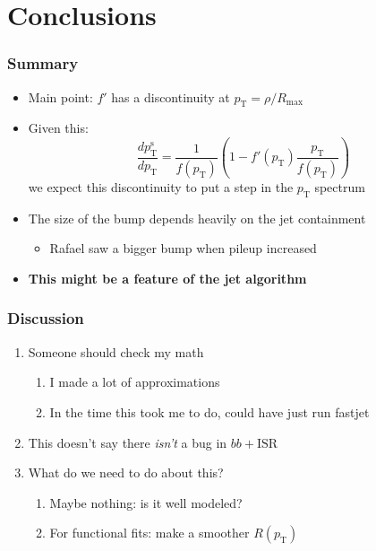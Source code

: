 \documentclass[xcolor={table}]{beamer}
\newcommand{\pt}{p_{\mathrm{T}}}
\newcommand{\ptr}{\pt}
\newcommand{\ptt}{\pt^{\text{s}}}
\begin{document}
\section{Conclusions}

\begin{frame}
  \frametitle{Summary}
  \begin{itemize}
  \item Main point: $f'$ has a discontinuity at $\ptr = \rho / R_{\text{max}}$
  \item Given this:
    \[ \frac{d\ptt}{d\ptr} = \frac{1}{f(\ptr)} \left( 1 - f'(\ptr) \frac{\ptr}{f(\ptr)} \right) \]
    we expect this discontinuity to put a step in the $\ptr$ spectrum
  \item The size of the bump depends heavily on the jet containment
    \begin{itemize}
    \item Rafael saw a bigger bump when pileup increased
    \end{itemize}
  \item \textbf{This might be a feature of the jet algorithm}
  \end{itemize}
\end{frame}

\begin{frame}
  \frametitle{Discussion}
  \begin{enumerate}
  \item Someone should check my math
    \begin{enumerate}[a]
    \item I made a lot of approximations
    \item In the time this took me to do, could have just run fastjet
    \end{enumerate}
  \item This doesn't say there \emph{isn't} a bug in $bb + \text{ISR}$
  \item What do we need to do about this?
    \begin{enumerate}[a]
    \item Maybe nothing: is it well modeled?
    \item For functional fits: make a smoother $R(\ptr)$
    \end{enumerate}
  \end{enumerate}
\end{frame}

\end{document}
